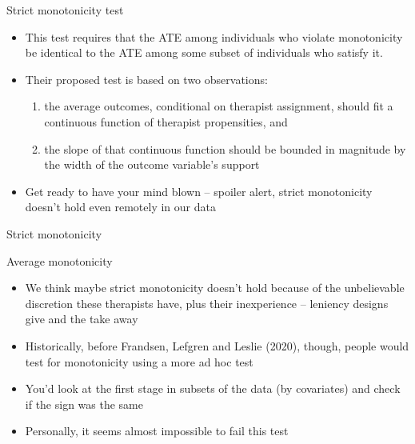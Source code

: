 \documentclass{beamer}
\begin{document}
\begin{frame}{Strict monotonicity test}

  \begin{itemize}

    \item This test requires that the ATE among individuals who violate monotonicity be identical to the ATE among some subset of individuals who satisfy it.

    \item Their proposed test is based on two observations:
          \begin{enumerate}
            \item  the average outcomes, conditional on therapist assignment, should fit a continuous function of therapist propensities, and
            \item  the slope of that continuous function should be bounded in magnitude by the width of the outcome variable’s support
          \end{enumerate}

    \item Get ready to have your mind blown -- spoiler alert, strict monotonicity doesn't hold even remotely in our data

  \end{itemize}

\end{frame}


\begin{frame}[shrink=20]{Strict monotonicity}

  

\end{frame}


\begin{frame}{Average monotonicity}

  \begin{itemize}
    \item We think maybe strict monotonicity doesn't hold because of the unbelievable discretion these therapists have, plus their inexperience -- leniency designs give and the take away
    \item Historically, before Frandsen, Lefgren and Leslie (2020), though, people would test for monotonicity using a more ad hoc test
    \item You'd look at the first stage in subsets of the data (by covariates) and check if the sign was the same
    \item Personally, it seems almost impossible to fail this test
  \end{itemize}

\end{frame}
\end{document}
